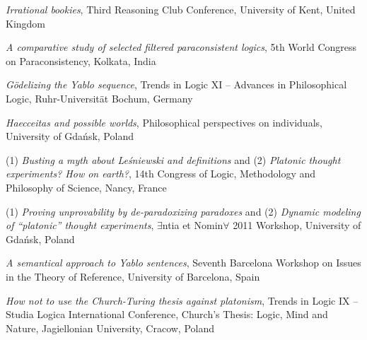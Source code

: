 \documentclass[10pt, a4paper]{article}
\newcommand{\years}[1]{\marginnote{\normalsize #1}}
\begin{document}
 \emph{Irrational bookies}, Third Reasoning Club Conference, University of Kent, United Kingdom


\vspace{0.5mm}


 \emph{A comparative study of selected filtered paraconsistent logics}, 5th World Congress on Paraconsistency,  Kolkata, India


\vspace{0.5mm}






\years{2012} \emph{G{\"o}delizing the Yablo sequence}, Trends in Logic XI -- Advances in Philosophical Logic,  Ruhr-Uni\-ver\-si\-t{\"a}t Bochum, Germany


\vspace{0.5mm}



\years{2011} \emph{Haecceitas and possible worlds}, Philosophical perspectives on individuals,  University of Gda\'nsk, Poland


\vspace{0.5mm}






(1) \emph{Busting a myth about Le\' sniewski and definitions} and (2) \emph{Platonic thought experiments? How on earth?}, 14th Congress of Logic, Methodology and Philosophy of Science,  Nancy, France


\vspace{0.5mm}


(1) \emph{Proving unprovability by de-paradoxizing paradoxes} and (2) \emph{Dynamic modeling of ``platonic'' thought experiments}, $\exists$ntia et Nomin$\forall$ 2011 Workshop,  University of Gda\' nsk, Poland





\vspace{0.5mm}



\emph{A semantical approach to Yablo sentences}, Seventh Barcelona Workshop on Issues in the Theory of Re\-fe\-ren\-ce,  University of Barcelona, Spain


\vspace{0.5mm}


\emph{How not to use the Church-Turing thesis against platonism}, Trends in Logic IX -- Studia Logica International Conference, Church's Thesis: Logic, Mind and Nature,  Jagiellonian University, Cracow, Poland
\end{document}
